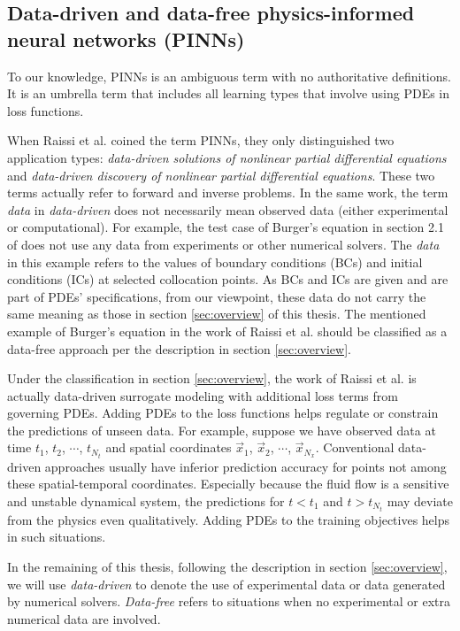 \subsection*{Data-driven and data-free physics-informed neural networks (PINNs)}

To our knowledge, PINNs is an ambiguous term with no authoritative definitions.
It is an umbrella term that includes all learning types that involve using PDEs in loss functions.

When Raissi et al. \cite{raissi_physics-informed_2017,raissi_physics_2017,raissi_physics-informed_2019} coined the term PINNs, they only distinguished two application types: {\it data-driven solutions of nonlinear partial differential equations} and {\it data-driven discovery of nonlinear partial differential equations}.
These two terms actually refer to forward and inverse problems.
In the same work, the term {\it data} in {\it data-driven} does not necessarily mean observed data (either experimental or computational).
For example, the test case of Burger's equation in section 2.1 of \cite{raissi_physics-informed_2017} does not use any data from experiments or other numerical solvers.
The {\it data} in this example refers to the values of boundary conditions (BCs) and initial conditions (ICs) at selected collocation points.
As BCs and ICs are given and are part of PDEs' specifications, from our viewpoint, these data do not carry the same meaning as those in section \ref{sec:overview} of this thesis.
The mentioned example of Burger's equation in the work of Raissi et al. should be classified as a data-free approach per the description in section \ref{sec:overview}.

Under the classification in section \ref{sec:overview}, the work of Raissi et al. is actually data-driven surrogate modeling with additional loss terms from governing PDEs.
Adding PDEs to the loss functions helps regulate or constrain the predictions of unseen data.
For example, suppose we have observed data at time $t_1$, $t_2$, $\cdots$, $t_{N_t}$ and spatial coordinates $\vec{x}_1$, $\vec{x}_2$, $\cdots$, $\vec{x}_{N_x}$. 
Conventional data-driven approaches usually have inferior prediction accuracy for points not among these spatial-temporal coordinates.
Especially because the fluid flow is a sensitive and unstable dynamical system, the predictions for $t < t_1$ and $t > t_{N_t}$ may deviate from the physics even qualitatively.
Adding PDEs to the training objectives helps in such situations.

In the remaining of this thesis, following the description in section \ref{sec:overview}, we will use {\it data-driven} to denote the use of experimental data or data generated by numerical solvers.
{\it Data-free} refers to situations when no experimental or extra numerical data are involved. 

